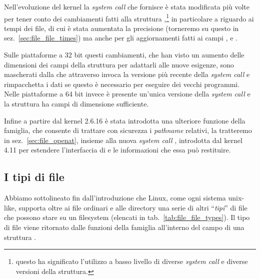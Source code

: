 Nell'evoluzione del kernel la \textit{system call} che fornisce  è
stata modificata più volte per tener conto dei cambiamenti fatti alla
struttura ,\footnote{questo ha significato l'utilizzo a basso
  livello di diverse \textit{system call} e diverse versioni della struttura.}
in particolare a riguardo ai tempi dei file, di cui è stata aumentata la
precisione (torneremo su questo in sez.~\ref{sec:file_file_times}) ma anche
per gli aggiornamenti fatti ai campi ,  e
.

Sulle piattaforme a 32 bit questi cambiamenti, che han visto un aumento delle
dimensioni dei campi della struttura per adattarli alle nuove esigenze, sono
mascherati dalla  che attraverso  invoca la versione più
recente della \textit{system call} e rimpacchetta i dati se questo è
necessario per eseguire dei vecchi programmi. Nelle piattaforme a 64 bit
invece è presente un'unica versione della \textit{system call} e la struttura
 ha campi di dimensione sufficiente.

Infine a partire dal kernel 2.6.16 è stata introdotta una ulteriore funzione
della famiglia,  che consente di trattare con sicurezza i
\textit{pathname} relativi, la tratteremo in sez.~\ref{sec:file_openat},
insieme alla nuova \textit{system call} , introdotta dal kernel
4.11 per estendere l'interfaccia di  e le informazioni che essa può
restituire.


\subsection{I tipi di file}
\label{sec:file_types}

Abbiamo sottolineato fin dall'introduzione che Linux, come ogni sistema
unix-like, supporta oltre ai file ordinari e alle directory una serie di altri
``\textsl{tipi}'' di file che possono stare su un filesystem (elencati in
tab.~\ref{tab:file_file_types}).  Il tipo di file viene ritornato dalle
funzioni della famiglia  all'interno del campo  di
una struttura . 

